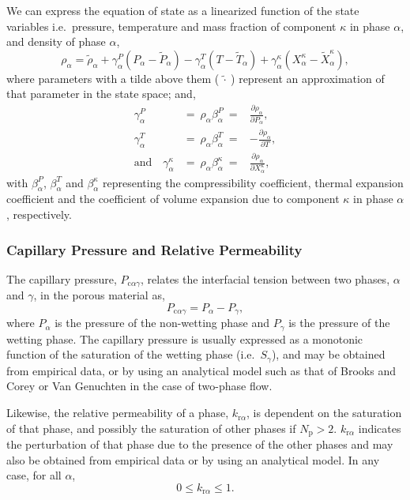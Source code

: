 We can express the equation of state as a linearized function of the state variables i.e.\ pressure, temperature and mass fraction of component $\kappa$ in phase $\alpha$, and density of phase $\alpha$,
\begin{equation}\label{e:eos}
\rho_\alpha = \tilde{\rho}_\alpha + \gamma_\alpha^P (P_\alpha - \tilde{P}_\alpha) - \gamma_\alpha^T (T-\tilde{T}_\alpha) + \gamma_\alpha^\kappa (X_\alpha^\kappa - \tilde{X}_\alpha^{\kappa}),
\end{equation}
where parameters with a tilde above them ($\tilde{\ \cdot\ }$) represent an approximation of that parameter in the state space; and,
\begin{eqnarray}
\gamma_\alpha^P & =\ \rho_\alpha \beta_\alpha^P\ = & \frac{\partial \rho_\alpha}{\partial P_\alpha}, \label{e:gammaP}\\
\gamma_\alpha^T & =\ \rho_\alpha \beta_\alpha^T\ = & - \frac{\partial \rho_\alpha}{\partial T}, \label{e:gammaT}\\
\mathrm{and} \quad \gamma_\alpha^\kappa & =\ \rho_\alpha \beta_\alpha^\kappa\ = & \frac{\partial \rho_\alpha}{\partial {X_\alpha^\kappa}}\label{e:gammaX},
\end{eqnarray}
with $\beta_\alpha^P$, $\beta_\alpha^T$ and $\beta_\alpha^\kappa$ representing the compressibility coefficient, thermal expansion coefficient and the coefficient of volume expansion due to component $\kappa$ in phase $\alpha$, respectively.

\subsubsection{Capillary Pressure and Relative Permeability}

The capillary pressure, $P_{\mathrm{c} \alpha \gamma}$, relates the interfacial tension between two phases, $\alpha$ and $\gamma$, in the porous material as,
\begin{equation}\label{e:capillary}
P_{\mathrm{c} \alpha \gamma} = P_\alpha - P_\gamma,
\end{equation}
where $P_\alpha$ is the pressure of the non-wetting phase and $P_\gamma$ is the pressure of the wetting phase. The capillary pressure is usually expressed as a monotonic function of the saturation of the wetting phase (i.e.\ $S_\gamma$), and may be obtained from empirical data, or by using an analytical model such as that of Brooks and Corey \cite{brooks_1964} or Van Genuchten \cite{vangenuchten_1980} in the case of two-phase flow.

Likewise, the relative permeability of a phase, $k_{\mathrm{r}\alpha}$, is dependent on the saturation of that phase, and possibly the saturation of other phases if $N_\mathrm{p} > 2$.  $k_{\mathrm{r}\alpha}$ indicates the perturbation of that phase due to the presence of the other phases and may also be obtained from empirical data or by using an analytical model.  In any case, for all $\alpha$,
\begin{equation}
0 \leq k_{\mathrm{r}\alpha} \leq 1.
\end{equation}

